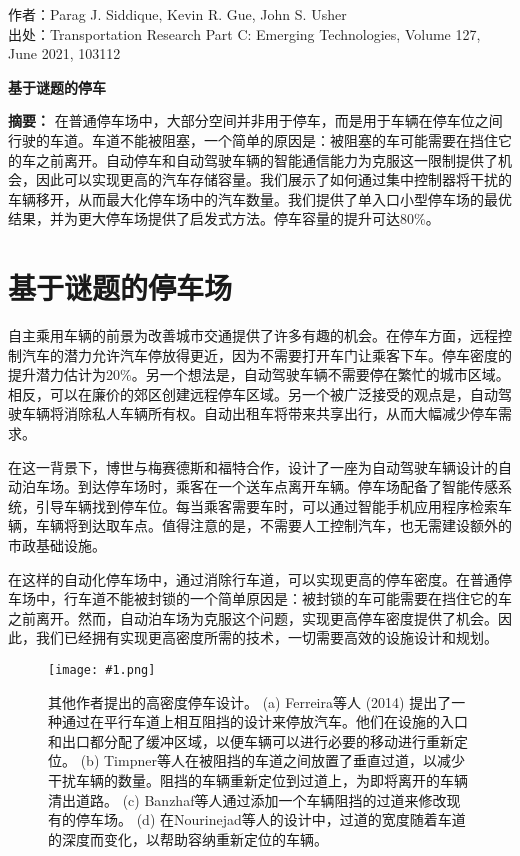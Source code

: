 \renewcommand{\fig}[3]{
    \begin{figure}[!htb]
        \centering
        \texttt{[image: \#1.png]}
        \caption{#3}
        \label{#1-zh}
    \end{figure}
}

\songti
\noindent 作者：Parag J. Siddique, Kevin R. Gue, John S. Usher\\
\noindent 出处：Transportation Research Part C: Emerging Technologies, Volume 127, June 2021, 103112
\vspace{2ex}

\begin{center}
    \textbf{基于谜题的停车}
\end{center}


\noindent\textbf{摘要：} 在普通停车场中，大部分空间并非用于停车，而是用于车辆在停车位之间行驶的车道。车道不能被阻塞，一个简单的原因是：被阻塞的车可能需要在挡住它的车之前离开。自动停车和自动驾驶车辆的智能通信能力为克服这一限制提供了机会，因此可以实现更高的汽车存储容量。我们展示了如何通过集中控制器将干扰的车辆移开，从而最大化停车场中的汽车数量。我们提供了单入口小型停车场的最优结果，并为更大停车场提供了启发式方法。停车容量的提升可达80\%。

\section{基于谜题的停车场}
自主乘用车辆的前景为改善城市交通提供了许多有趣的机会。在停车方面，远程控制汽车的潜力允许汽车停放得更近，因为不需要打开车门让乘客下车。停车密度的提升潜力估计为20\%。另一个想法是，自动驾驶车辆不需要停在繁忙的城市区域。相反，可以在廉价的郊区创建远程停车区域。另一个被广泛接受的观点是，自动驾驶车辆将消除私人车辆所有权。自动出租车将带来共享出行，从而大幅减少停车需求。

在这一背景下，博世与梅赛德斯和福特合作，设计了一座为自动驾驶车辆设计的自动泊车场。到达停车场时，乘客在一个送车点离开车辆。停车场配备了智能传感系统，引导车辆找到停车位。每当乘客需要车时，可以通过智能手机应用程序检索车辆，车辆将到达取车点。值得注意的是，不需要人工控制汽车，也无需建设额外的市政基础设施。

在这样的自动化停车场中，通过消除行车道，可以实现更高的停车密度。在普通停车场中，行车道不能被封锁的一个简单原因是：被封锁的车可能需要在挡住它的车之前离开。然而，自动泊车场为克服这个问题，实现更高停车密度提供了机会。因此，我们已经拥有实现更高密度所需的技术，一切需要高效的设施设计和规划。

\fig{f1}{0.8}{其他作者提出的高密度停车设计。 (a) Ferreira等人 (2014) 提出了一种通过在平行车道上相互阻挡的设计来停放汽车。他们在设施的入口和出口都分配了缓冲区域，以便车辆可以进行必要的移动进行重新定位。 (b) Timpner等人在被阻挡的车道之间放置了垂直过道，以减少干扰车辆的数量。阻挡的车辆重新定位到过道上，为即将离开的车辆清出道路。 (c) Banzhaf等人通过添加一个车辆阻挡的过道来修改现有的停车场。 (d) 在Nourinejad等人的设计中，过道的宽度随着车道的深度而变化，以帮助容纳重新定位的车辆。}

